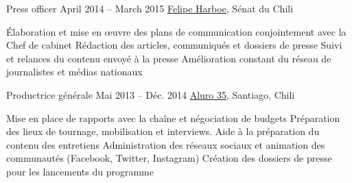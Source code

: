 %
%



\begin{joblist}




\item[Press officer]{April 2014 -- March 2015}
     { \href{https://www.harboe.cl/}{Felipe Harboe}, Sénat du Chili } 
	 {
                
			\iftbftiny \setlength{\parskip}{-10pt} \fi
			\begin{itemize}
			  \iftbftiny \setlength\itemsep{-3pt} \fi
			  \cvitem[\checkmark] Élaboration et mise en œuvre des plans de communication conjointement avec la Chef de cabinet
			  \cvitem[\checkmark] Rédaction des articles, communiqués et dossiers de presse
			  \cvitem[\checkmark] Suivi et relances du contenu envoyé à la presse
			  \cvitem[\checkmark] Amélioration constant du réseau de journalistes et médias nationaux
			\end{itemize}     
			
	}
    
    
    
\item[Productrice générale]{Mai 2013 -- Déc. 2014}
     {\href{https://www.aluro35.com/}  {Aluro 35}, Santiago, Chili}
     {	
			
			\iftbftiny \setlength{\parskip}{-10pt} \fi
			\begin{itemize}
			  \iftbftiny \setlength\itemsep{-3pt} \fi
			  \cvitem[\checkmark] Mise en place de rapports avec la chaîne et négociation de budgets                       
			  \cvitem[\checkmark] Préparation des lieux de tournage, mobilisation et interviews. Aide à la préparation du contenu des entretiens 
			  \cvitem[\checkmark] Administration des réseaux sociaux et animation des communautés (Facebook, Twitter, Instagram)                 
			  \cvitem[\checkmark] Création des dossiers de presse pour les lancements du programme                                             
			\end{itemize}     
			
}
\end{joblist}
